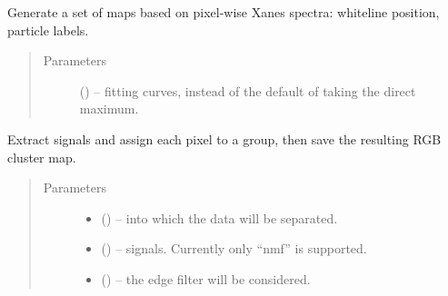 \documentclass[letterpaper,10pt,english]{sphinxmanual}
\begin{document}
\begin{fulllineitems}

\begin{fulllineitems}
\label{\detokenize{xanespy:xanespy.xanes_frameset.XanesFrameset.calculate_maps}}
Generate a set of maps based on pixel-wise Xanes spectra: whiteline
position, particle labels.
\begin{quote}\begin{description}
\item[{Parameters}] \leavevmode
{} (\sphinxstyleliteralemphasis{, }) -- fitting curves, instead of the default of taking the direct
maximum.

\end{description}\end{quote}

\end{fulllineitems}


\begin{fulllineitems}
\label{\detokenize{xanespy:xanespy.xanes_frameset.XanesFrameset.calculate_signals}}
Extract signals and assign each pixel to a group, then save the
resulting RGB cluster map.
\begin{quote}\begin{description}
\item[{Parameters}] \leavevmode\begin{itemize}
\item {} 
 (\sphinxstyleliteralemphasis{-}) -- into which the data will be separated.

\item {} 
 (\sphinxstyleliteralemphasis{-}) -- signals. Currently only ``nmf'' is supported.

\item {} 
 (\sphinxstyleliteralemphasis{-}) -- the edge filter will be considered.

\end{itemize}

\end{description}\end{quote}


\end{fulllineitems}
\end{fulllineitems}
\end{document}
